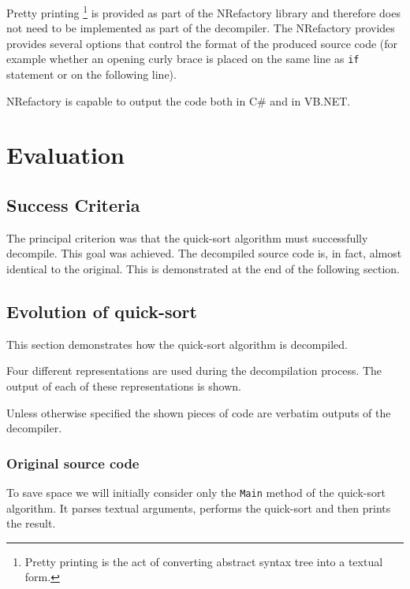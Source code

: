 \documentclass[12pt,twoside,notitlepage]{report}
\begin{document}
Pretty printing%
\footnote{Pretty printing is the act of converting abstract
syntax tree into a textual form.}
is provided as part of the NRefactory library and therefore does not
need to be implemented as part of the decompiler.
The NRefactory provides provides several options that control
the format of the produced source code (for example whether an opening 
curly brace is placed on the same line as \verb|if| statement or on
the following line).

NRefactory is capable to output the code both in C\# and in VB.NET.


\cleardoublepage
\chapter{Evaluation}

\newcommand{\impref}[1]{See section \emph{\ref{#1} #1} on page \pageref{#1} for reference.}

\section{Success Criteria}

The principal criterion was that the quick-sort algorithm must successfully
decompile.  This goal was achieved.
The decompiled source code is, in fact, almost identical to the original.
This is demonstrated at the end of the following section.

\section{Evolution of quick-sort}

This section demonstrates how the quick-sort algorithm is decompiled.

Four different representations are used during the decompilation process.
The output of each of these representations is shown.

Unless otherwise specified the shown pieces of code are 
verbatim outputs of the decompiler.

\subsection{Original source code}

To save space we will initially consider only the \verb|Main| method of
the quick-sort algorithm.  It parses textual arguments,
performs the quick-sort and then prints the result.
\end{document}
